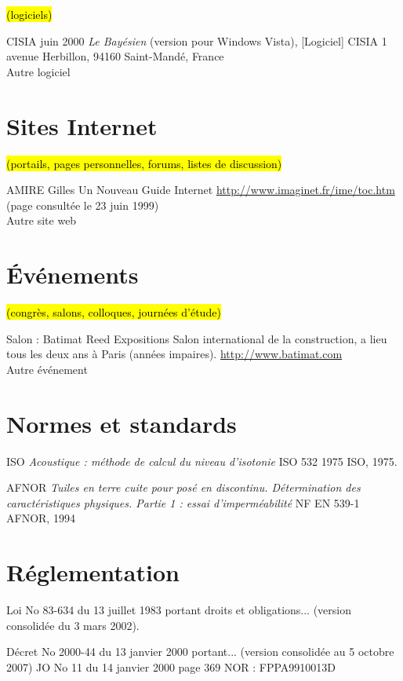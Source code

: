 \documentclass[a4paper,12pt]{article}
\begin{document}
\hl{(logiciels)}

CISIA juin 2000 \textit{Le Bay\'esien} (version pour Windows Vista), [Logiciel] CISIA 1 avenue Herbillon, 94160 Saint-Mand\'e, France\\
Autre logiciel

\section*{Sites Internet}
\hl{(portails, pages personnelles, forums, listes de discussion)}

AMIRE Gilles Un Nouveau Guide Internet \url{http://www.imaginet.fr/ime/toc.htm} (page consult\'ee le 23 juin 1999)\\
Autre site web

\section*{\'Ev\'enements}
\hl{(congr\`es, salons, colloques, journ\'ees d'\'etude)}

Salon : Batimat Reed Expositions Salon international de la construction, a lieu tous les deux ans \`a Paris (ann\'ees impaires). \url{http://www.batimat.com}\\
Autre \'ev\'enement

\section*{Normes et standards}
ISO \textit{Acoustique : m\'ethode de calcul du niveau d'isotonie} ISO 532 1975 ISO, 1975.

AFNOR \textit{Tuiles en terre cuite pour pos\'e en discontinu. D\'etermination des caract\'eristiques physiques. Partie 1 : essai d'imperm\'eabilit\'e} NF EN 539-1 AFNOR, 1994



\section*{R\'eglementation}
Loi No 83-634 du 13 juillet 1983 portant droits et obligations... (version consolid\'ee du 3 mars 2002).

D\'ecret No 2000-44 du 13 janvier 2000 portant... (version consolid\'ee au 5 octobre 2007) JO No 11 du 14 janvier 2000 page 369 NOR : FPPA9910013D


\newrefcontext[labelprefix=B]
\printbibliography[type=patent,resetnumbers=true,title=Brevets,keyword=B]
\end{document}
